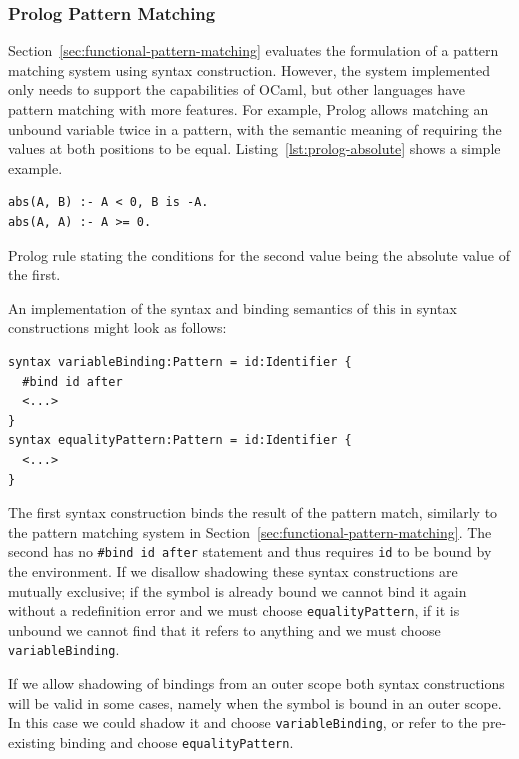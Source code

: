 \documentclass{kththesis}
\begin{document}
\subsubsection{Prolog Pattern Matching} \label{sec:prolog-pattern-matching}

Section~\ref{sec:functional-pattern-matching} evaluates the formulation of a pattern matching system using syntax construction. However, the system implemented only needs to support the capabilities of OCaml, but other languages have pattern matching with more features. For example, Prolog allows matching an unbound variable twice in a pattern, with the semantic meaning of requiring the values at both positions to be equal. Listing~\ref{lst:prolog-absolute} shows a simple example.

\begin{listing}[h]
\begin{verbatim}
abs(A, B) :- A < 0, B is -A.
abs(A, A) :- A >= 0.
\end{verbatim}
\caption{Prolog rule stating the conditions for the second value being the absolute value of the first.}
\label{lst:prolog-absolute}
\end{listing}

An implementation of the syntax and binding semantics of this in syntax constructions might look as follows:

\begin{verbatim}
syntax variableBinding:Pattern = id:Identifier {
  #bind id after
  <...>
}
syntax equalityPattern:Pattern = id:Identifier {
  <...>
}
\end{verbatim}

The first syntax construction binds the result of the pattern match, similarly to the pattern matching system in Section~\ref{sec:functional-pattern-matching}. The second has no \texttt{#bind id after} statement and thus requires \texttt{id} to be bound by the environment. If we disallow shadowing these syntax constructions are mutually exclusive; if the symbol is already bound we cannot bind it again without a redefinition error and we must choose \texttt{equalityPattern}, if it is unbound we cannot find that it refers to anything and we must choose \texttt{variableBinding}.

If we allow shadowing of bindings from an outer scope both syntax constructions will be valid in some cases, namely when the symbol is bound in an outer scope. In this case we could shadow it and choose \texttt{variableBinding}, or refer to the pre-existing binding and choose \texttt{equalityPattern}.
\end{document}
